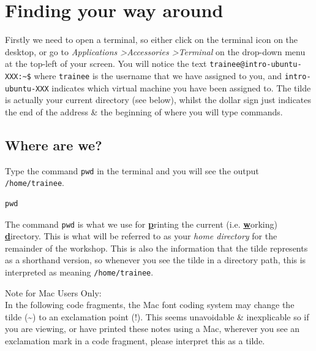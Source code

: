 \documentclass[a4paper,12pt,twoside]{memoir}
\begin{document}
\clearpage
\section{Finding your way around}
\begin{information}
Firstly we need to open a terminal, so either click on the terminal icon on the desktop, or go to \textit{Applications \textgreater Accessories \textgreater Terminal} on the drop-down menu at the top-left of your screen.
You will notice the text \texttt{trainee@intro-ubuntu-XXX:\~{}\$} where \texttt{trainee} is the username that we have assigned to you, and \texttt{intro-ubuntu-XXX} indicates which virtual machine you have been assigned to.
The tilde is actually your current directory (see below), whilst the dollar sign just indicates the end of the address \& the beginning of where you will type commands. \\
\end{information}

\subsection{Where are we?}
\begin{steps}
Type the command \texttt{pwd} in the terminal and you will see the output \texttt{/home/trainee}.
\begin{lstlisting}
pwd
\end{lstlisting}
The command \texttt{pwd} is what we use for \underline{\textbf{p}}rinting the current (i.e. \underline{\textbf{w}}orking) \underline{\textbf{d}}irectory.
This is what will be referred to as your \textit{home directory} for the remainder of the workshop.
This is also the information that the tilde represents as a shorthand version, so whenever you see the tilde in a directory path, this is interpreted as meaning \texttt{/home/trainee}. \\
\end{steps}

\begin{warning}
\Large{Note for Mac Users Only:}\\
\normalsize{In the following code fragments, the Mac font coding system may change the tilde (\~{}) to an exclamation point (!).
This seems unavoidable \& inexplicable so if you are viewing, or have printed these notes using a Mac, wherever you see an exclamation mark in a code fragment, please interpret this as a tilde.}
\end{warning}
\end{document}
